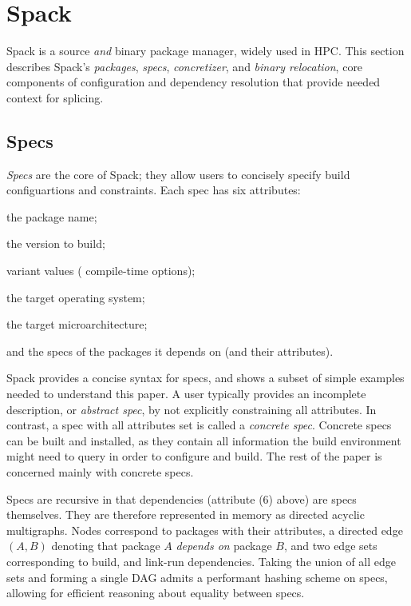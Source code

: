 \section{Spack}
\label{sec:spack}

Spack is a source {\it and} binary package manager, widely used in HPC. This
section describes Spack's \textit{packages}, \textit{specs},
\textit{concretizer}, and \textit{binary relocation}, core components of
configuration and dependency resolution that provide needed context for
splicing.

\subsection{Specs}
\label{sec:spack-specs}
\textit{Specs} are the core of Spack; they allow users to concisely specify
build configuartions and constraints. Each spec has six attributes:
\begin{enumerate*}
  \item the package name;
  \item the version to build;
  \item variant values (\ie{} compile-time options);
  \item the target operating system;
  \item the target microarchitecture;
  \item and the specs of the packages it depends on (and their attributes).
\end{enumerate*}
%

%
Spack provides a concise syntax for specs, and 
shows a subset of simple examples needed to understand this paper.
A user typically provides an incomplete description,
or \textit{abstract spec}, by not explicitly constraining all
attributes. In contrast, a spec with all attributes set is called a
\textit{concrete spec}. Concrete specs can be built and installed, as they
contain all information the build environment might need to query in order
to configure and build.
The rest of the paper is concerned mainly with concrete specs.

Specs are recursive in that dependencies (attribute (6) above) are specs
themselves. They are therefore represented in memory as directed acyclic
multigraphs. Nodes correspond to packages with their attributes, a directed
edge $(A, B)$ denoting that package $A$ \textit{depends on} package $B$, and two
edge sets corresponding to build, and link-run dependencies.  Taking the union
of all edge sets and forming a single DAG admits a performant hashing scheme on
specs, allowing for efficient reasoning about equality between specs.

